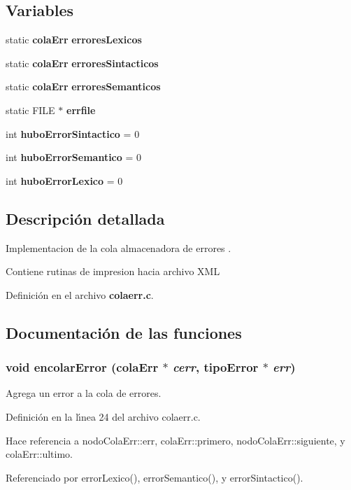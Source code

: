 \subsection*{Variables}
\begin{CompactItemize}
\item 
static {\bf cola\-Err} {\bf errores\-Lexicos}
\item 
static {\bf cola\-Err} {\bf errores\-Sintacticos}
\item 
static {\bf cola\-Err} {\bf errores\-Semanticos}
\item 
static FILE $\ast$ {\bf errfile}
\item 
int {\bf hubo\-Error\-Sintactico} = 0
\item 
int {\bf hubo\-Error\-Semantico} = 0
\item 
int {\bf hubo\-Error\-Lexico} = 0
\end{CompactItemize}


\subsection{Descripci\'{o}n detallada}
Implementacion de la cola almacenadora de errores . 

Contiene rutinas de impresion hacia archivo XML 

Definici\'{o}n en el archivo {\bf colaerr.c}.

\subsection{Documentaci\'{o}n de las funciones}
\subsubsection{\setlength{\rightskip}{0pt plus 5cm}void encolar\-Error ({\bf cola\-Err} $\ast$ {\em cerr}, {\bf tipo\-Error} $\ast$ {\em err})}\label{colaerr_8c_a7}


Agrega un error a la cola de errores. 



Definici\'{o}n en la l\'{\i}nea 24 del archivo colaerr.c.

Hace referencia a nodo\-Cola\-Err::err, cola\-Err::primero, nodo\-Cola\-Err::siguiente, y cola\-Err::ultimo.

Referenciado por error\-Lexico(), error\-Semantico(), y error\-Sintactico().
